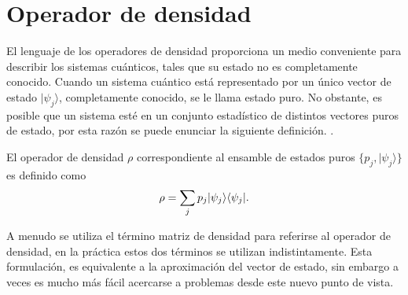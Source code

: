 \section{Operador de densidad}\label{sec:Cap1:OpDensidad}%
El lenguaje de los operadores de densidad proporciona un  medio conveniente
para describir los sistemas cuánticos, tales que su estado no es completamente
conocido. Cuando un sistema cuántico está representado por un único vector de estado $|\psi_j\rangle $, completamente conocido, se le llama estado puro. No obstante, es posible que un sistema esté en un conjunto estadístico de distintos vectores puros de estado, por esta razón se puede enunciar la siguiente definición. .

\begin{definition} El operador de densidad
$\rho$ correspondiente al ensamble de estados puros $\{p_j,|\psi_j \rangle \}$
es definido como {\cite{wilde2011classical}}
  	\begin{equation}{\label{defdensityoperator}}
  		\rho=\sum_{j}p_j|\psi_j\rangle \langle \psi_j|.
  	\end{equation}
\end{definition}
A menudo se utiliza el término matriz de densidad para referirse al operador de
densidad, en la práctica estos dos términos se utilizan indistintamente. Esta
formulación, es equivalente a la aproximación del vector de estado, sin embargo
a veces es mucho más fácil acercarse a problemas desde este nuevo punto de
vista.
 
